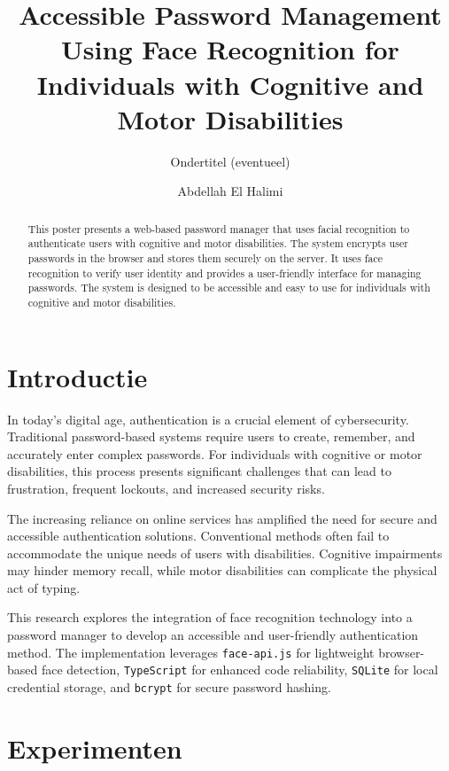 \documentclass[a0,portrait]{hogent-poster}
\title{Accessible Password Management Using Face Recognition for Individuals with Cognitive and Motor Disabilities}
\subtitle{Ondertitel (eventueel)}
\author{Abdellah El Halimi}
\begin{document}
\maketitle

\begin{abstract}
This poster presents a web-based password manager that uses facial recognition to authenticate users with cognitive and motor disabilities. The system encrypts user passwords in the browser and stores them securely on the server. It uses face recognition to verify user identity and provides a user-friendly interface for managing passwords. The system is designed to be accessible and easy to use for individuals with cognitive and motor disabilities.
\end{abstract}

\begin{multicols}{2} %

\section{Introductie}

In today's digital age, authentication is a crucial element of cybersecurity. Traditional password-based systems require users to create, remember, and accurately enter complex passwords. For individuals with cognitive or motor disabilities, this process presents significant challenges that can lead to frustration, frequent lockouts, and increased security risks.

The increasing reliance on online services has amplified the need for secure and accessible authentication solutions. Conventional methods often fail to accommodate the unique needs of users with disabilities. Cognitive impairments may hinder memory recall, while motor disabilities can complicate the physical act of typing.

This research explores the integration of face recognition technology into a password manager to develop an accessible and user-friendly authentication method. The implementation leverages \texttt{face-api.js} for lightweight browser-based face detection, \texttt{TypeScript} for enhanced code reliability, \texttt{SQLite} for local credential storage, and \texttt{bcrypt} for secure password hashing.

\section{Experimenten}


\end{multicols}
\end{document}
